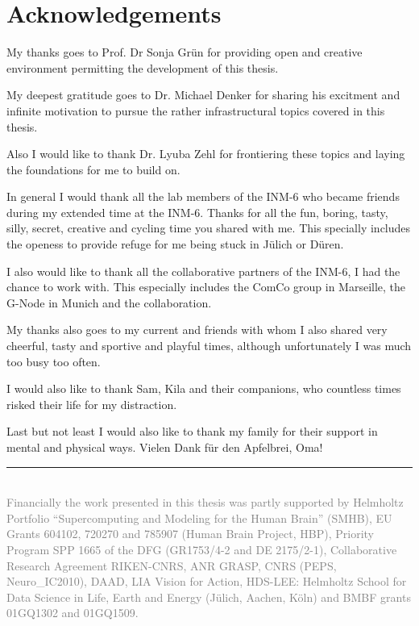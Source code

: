 \cleardoublepage
\pagestyle{plain}
\section*{Acknowledgements}

My thanks goes to Prof. Dr Sonja Grün for providing open and creative environment permitting the development of this thesis.\newline

My deepest gratitude goes to Dr. Michael Denker for sharing his excitment and infinite motivation to pursue the rather infrastructural topics covered in this thesis.\newline

Also I would like to thank Dr. Lyuba Zehl for frontiering these topics and laying the foundations for me to build on.\newline

In general I would thank all the lab members of the INM-6 who became friends during my extended time at the INM-6. Thanks for all the fun, boring, tasty, silly, secret, creative and cycling time you shared with me. This specially includes the openess to provide refuge for me being stuck in Jülich or Düren.\newline

I also would like to thank all the collaborative partners of the INM-6, I had the chance to work with. This especially includes the ComCo group in Marseille, the G-Node in Munich and the  collaboration.\newline

My thanks also goes to my current and friends with whom I also shared very cheerful, tasty and sportive and playful times, although unfortunately I was much too busy too often.\newline

I would also like to thank Sam, Kila and their companions, who countless times risked their life for my distraction.
\newline

Last but not least I would also like to thank my family for their support in mental and physical ways. Vielen Dank für den Apfelbrei, Oma!\newline

\vfill
\textcolor{gray}{\rule{0.3\textwidth}{0.4pt}\\
\smaller
Financially the work presented in this thesis was partly supported by Helmholtz Portfolio “Supercomputing and Modeling for the Human Brain” (SMHB), EU Grants 604102, 720270 and 785907 (Human Brain Project, HBP), Priority Program SPP 1665 of the DFG (GR1753/4-2 and DE 2175/2-1), Collaborative Research Agreement RIKEN-CNRS, ANR GRASP, CNRS (PEPS, Neuro\_IC2010), DAAD, LIA Vision for Action, HDS-LEE: Helmholtz School for Data Science in Life, Earth and Energy (Jülich, Aachen, Köln) and BMBF grants 01GQ1302 and 01GQ1509.}
